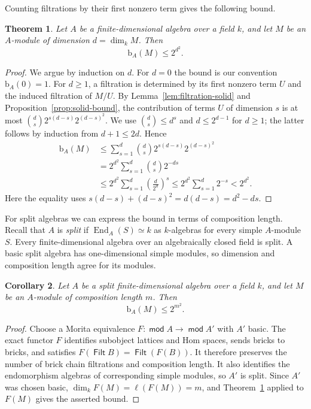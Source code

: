 \documentclass[a4paper,reqno,10pt]{amsart}
\newtheorem{theorem}{Theorem}[section]
\newtheorem{corollary}[theorem]{Corollary}
\theoremstyle{definition}
\numberwithin{equation}{section}
\newcommand{\End}{\operatorname{End}}
\DeclareMathOperator{\modu}{\mathsf{mod}}
\DeclareMathOperator{\Filt}{\mathsf{Filt}}
\newcommand{\bcount}{\mathrm b}
\begin{document}
Counting filtrations by their first nonzero term gives the following bound.

\begin{theorem}\label{thm:uniform}
Let $A$ be a finite-dimensional algebra over a field $k$, and let $M$
be an $A$-module of dimension $d=\dim_k M$. Then
\[
 \bcount_A(M)\leq 2^{d^2}.
\]
\end{theorem}

\begin{proof}
We argue by induction on $d$. For $d=0$ the bound is our
convention $\bcount_A(0)=1$.
For $d\geq1$, a filtration is determined by its first nonzero term $U$
and the induced filtration of $M/U$. By
Lemma~\ref{lem:filtration-solid} and Proposition~\ref{prop:solid-bound},
the contribution of terms $U$ of dimension $s$ is at most
$\binom ds2^{s(d-s)}2^{(d-s)^2}$. We use
$\binom ds\leq d^s$ and $d\leq2^{d-1}$ for $d\geq1$; the latter
follows by induction from $d+1\leq2d$. Hence
\begin{align*}
 \bcount_A(M)
 &\leq\sum_{s=1}^d\binom ds 2^{s(d-s)}2^{(d-s)^2}\\
 &=2^{d^2}\sum_{s=1}^d\binom ds 2^{-ds}\\
 &\leq2^{d^2}\sum_{s=1}^d\left(\frac d{2^d}\right)^s
 \leq2^{d^2}\sum_{s=1}^d2^{-s}<2^{d^2}.
\end{align*}
Here the equality uses
$s(d-s)+(d-s)^2=d(d-s)=d^2-ds$.
\end{proof}

For split algebras we can express the bound in terms of composition
length. Recall that $A$ is \emph{split} if $\End_A(S)\simeq k$ as $k$-algebras
for every simple $A$-module $S$. Every finite-dimensional algebra over an
algebraically closed field is split. A basic split algebra has one-dimensional
simple modules, so dimension and composition length agree for its modules.

\begin{corollary}\label{cor:uniform-length}
Let $A$ be a split finite-dimensional algebra over a field $k$, and let
$M$ be an $A$-module of composition length $m$. Then
\[
 \bcount_A(M)\leq 2^{m^2}.
\]
\end{corollary}

\begin{proof}
Choose a Morita equivalence $F:\modu A\to\modu A'$ with $A'$ basic. The exact
functor $F$ identifies subobject lattices and Hom spaces, sends bricks to
bricks, and satisfies $F(\Filt B)=\Filt(F(B))$. It therefore preserves the
number of brick chain filtrations and composition length. It also
identifies the endomorphism algebras of corresponding simple modules,
so $A'$ is split. Since $A'$ was chosen basic,
$\dim_k F(M)=\ell(F(M))=m$, and
Theorem~\ref{thm:uniform} applied to $F(M)$ gives the asserted bound.
\end{proof}
\end{document}
